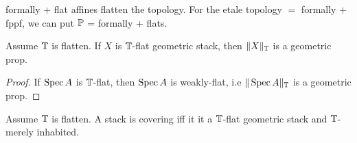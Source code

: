 \begin{example}
	 formally \etale + flat affines flatten the \etale topology.
	For the etale topology $=$ formally \etale $+$ fppf, we can put $\mathbb{P}$ = formally \etale + flats. %
\end{example}

\begin{lemma}{\label{lemma:TruncOfP}}
	Assume $\mathbb{T}$ is flatten.
	If $X$ is $\mathbb{T}$-flat geometric stack, then $\|X\|_{\mathbb{T}}$ is a geometric prop.
\end{lemma}
\begin{proof}
	
	If $\operatorname{Spec} A$ is $\mathbb{T}$-flat, then $\operatorname{Spec} A$ is weakly-flat, i.e $\| \operatorname{Spec} A\|_{\mathbb{T}}$ is a geometric prop.
\end{proof}
\begin{lemma}{\label{lemma:detectCovering}}
	Assume $\mathbb{T}$ is flatten.
	A stack is covering iff it it a $\mathbb{T}$-flat geometric stack and $\mathbb{T}$-merely inhabited.
\end{lemma}

